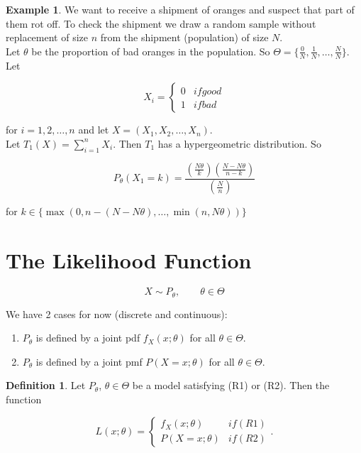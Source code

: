 \documentclass[12pt]{article}
\theoremstyle{definition}
\newtheorem*{definition}{Definition}
\newtheorem*{example}{Example}
\begin{document}
\begin{example}
We want to receive a shipment of oranges and suspect that part of them
rot off. To check the shipment we draw a random sample without replacement
of size $n$ from the shipment (population) of size $N$.\\

Let $\theta$ be the proportion of bad oranges in the population. So
$\Theta = \{ \frac{0}{N}, \frac{1}{N}, \ldots, \frac{N}{N} \}$.\\

Let

\begin{equation*}
X_i =
\begin{cases*}
0 & if good \\
1 & if bad
\end{cases*}
\end{equation*}

for $i = 1, 2, \ldots, n$ and let $X = (X_1, X_2, \ldots, X_n)$.\\

Let $\displaystyle T_1(X) = \sum^{n}_{i = 1} X_i$. Then $T_1$ has a
hypergeometric distribution. So

\begin{equation*}
P_{\theta}(X_1 = k) = \frac{ \left( \frac{N\theta}{k} \right) \left( \frac{N - N\theta}{n-k} \right)}
{ \left( \frac{N}{n} \right) }
\end{equation*}

for $k \in \{ \max(0, n - (N - N\theta), \ldots, \min(n, N\theta))\}$
\end{example}

\section{The Likelihood Function}

$$ X \sim P_{\theta}, \quad\quad \theta \in \Theta $$

We have 2 cases for now (discrete and continuous):

\begin{enumerate}[label = (R\arabic*)]
\item $P_{\theta}$ is defined by a joint pdf $f_X (x; \theta)$ for all $\theta \in \Theta$.
\item $P_{\theta}$ is defined by a joint pmf $P(X = x; \theta)$ for all $\theta \in \Theta$.
\end{enumerate}

\begin{definition}
Let $P_{\theta}$, $\theta \in \Theta$ be a model satisfying (R1) or (R2). Then the function

\begin{equation*}
L(x; \theta) =
\begin{cases*}
f_X(x; \theta) & if (R1) \\
P(X = x; \theta) & if (R2)
\end{cases*}.
\end{equation*}
\end{definition}
\end{document}
